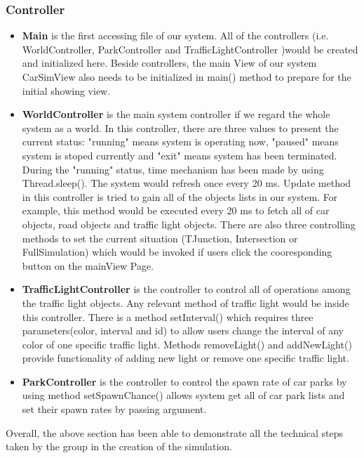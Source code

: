 \documentclass[11pt]{article}
\begin{document}
\subsubsection{Controller}
        
\begin{itemize}[noitemsep]
\item \textbf{Main} is the first accessing file of our system. All of the controllers (i.e. WorldController, ParkController and TrafficLightController )would be created and initialized here. Beside controllers, the main View of our system CarSimView also needs to be initialized in main() method to prepare for the initial showing view.

\item \textbf{WorldController} is the main system controller if we regard the whole system as a world. In this controller, there are three values to present the current status: "running" means system is operating now, "paused" means system is stoped currently and "exit" means system has been terminated. During the "running" status, time mechanism has been made by using Thread.sleep(). The system would refresh once every 20 ms. Update method in this controller is tried to gain all of the objects lists in our system. For example, this method would be executed every 20 ms to fetch all of car objects, road objects and traffic light objects. There are also three controlling methods to set the current situation (TJunction, Intersection or FullSimulation) which would be invoked if users click the cooresponding button on the mainView Page.

\item \textbf{TrafficLightController} is the controller to control all of operations among the traffic light objects. Any relevant method of traffic light would be inside this controller. There is a method setInterval() which requires three parameters(color, interval and id) to allow users change the interval of any color of one specific traffic light. Methods removeLight() and addNewLight() provide functionality of adding new light or remove one specific traffic light.

\item \textbf{ParkController} is the controller to control the spawn rate of car parks by using method setSpawnChance() allows system get all of car park lists and set their spawn rates by passing argument.
\end{itemize}
Overall, the above section has been able to demonstrate all the technical steps taken by the group in the creation of the simulation. 
	
\end{document}

